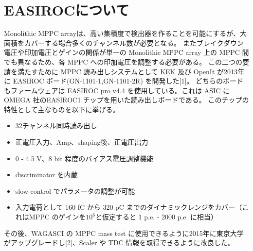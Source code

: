 
\section{EASIROCについて} \label{introduction}
Monolithic MPPC arrayは、高い集積度で検出器を作ることを可能にするが、大面積をカバーする場合多くのチャンネル数が必要となる。
またブレイクダウン電圧や印加電圧とゲインの関係が単一の Monolithic MPPC array 上の MPPC 間でも異なるため、各 MPPC への印加電圧を調整する必要がある。
この二つの要請を満たすために MPPC 読み出しシステムとして KEK 及び OpenIt が2013年に EASIROC ボード(GN-1101-1,GN-1101-2R) を開発した[1]。
どちらのボードもファームウェアは EASIROC pro v4.4 を使用している。これは ASIC に OMEGA 社のEASIROC1 チップを用いた読み出しボードである。
このチップの特性として主なものを以下に挙げる。
\begin{itemize}
\item 32チャンネル同時読み出し
\item 正電圧入力、Amp、shaping後、正電圧出力
\item 0 - 4.5 V、8 bit 程度のバイアス電圧調整機能
\item discriminator を内蔵
\item slow control でパラメータの調整が可能
\item 入力電荷として 160 fC から 320 pC までのダイナミックレンジをカバー（これはMPPC のゲインを$10^6$と仮定すると 1 p.e. - 2000 p.e. に相当）
\end{itemize}

その後、WAGASCI の MPPC mass test に使用できるように2015年に東京大学がアップグレードし[2]、Scaler や TDC 情報を取得できるように改良した。

